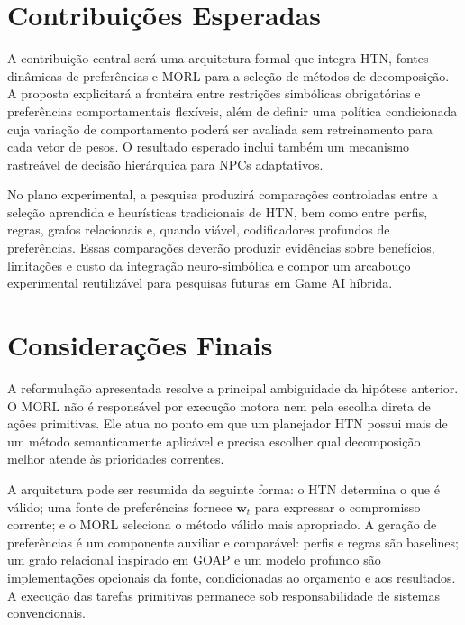 \chapter{Contribuições Esperadas}

A contribuição central será uma arquitetura formal que integra HTN, fontes
dinâmicas de preferências e MORL para a seleção de métodos de decomposição. A
proposta explicitará a fronteira entre restrições simbólicas obrigatórias e
preferências comportamentais flexíveis, além de definir uma política
condicionada cuja variação de comportamento poderá ser avaliada sem
retreinamento para cada vetor de pesos. O resultado esperado inclui também um
mecanismo rastreável de decisão hierárquica para NPCs adaptativos.

No plano experimental, a pesquisa produzirá comparações controladas entre a
seleção aprendida e heurísticas tradicionais de HTN, bem como entre perfis,
regras, grafos relacionais e, quando viável, codificadores profundos de
preferências. Essas comparações deverão produzir evidências sobre benefícios,
limitações e custo da integração neuro-simbólica e compor um arcabouço
experimental reutilizável para pesquisas futuras em Game AI híbrida.

\chapter{Considerações Finais}

A reformulação apresentada resolve a principal ambiguidade da hipótese
anterior.
O MORL não é responsável por execução motora nem pela escolha direta de ações
primitivas.
Ele atua no ponto em que um planejador HTN possui mais de um método semanticamente
aplicável e precisa escolher qual decomposição melhor atende às prioridades correntes.

A arquitetura pode ser resumida da seguinte forma: o HTN determina o que é
válido; uma fonte de preferências fornece $\mathbf{w}_t$ para expressar o
compromisso corrente; e o MORL seleciona o método válido mais apropriado.
A geração de preferências é um componente auxiliar e comparável: perfis e
regras são baselines; um grafo relacional inspirado em GOAP e um modelo profundo
são implementações opcionais da fonte, condicionadas ao orçamento e aos resultados.
A execução das tarefas primitivas permanece sob responsabilidade de sistemas
convencionais.

